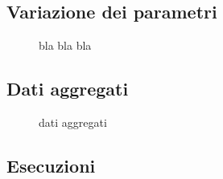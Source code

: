 \documentclass[a4paper]{article}
\begin{document}
\subsection{Variazione dei parametri}

\begin{figure}
    \begin{center}
        \scalebox{0.65}{}
    \end{center}
    \begin{center}
        \scalebox{0.65}{}
    \end{center}
    \begin{center}
      \scalebox{0.65}{}
    \end{center}
  \caption{bla bla bla}
\end{figure}

\subsection{Dati aggregati}

\begin{figure}
    \begin{center}
        \scalebox{0.65}{}
    \end{center}
    \caption{dati aggregati}
\end{figure}

\subsection{Esecuzioni}
\end{document}
